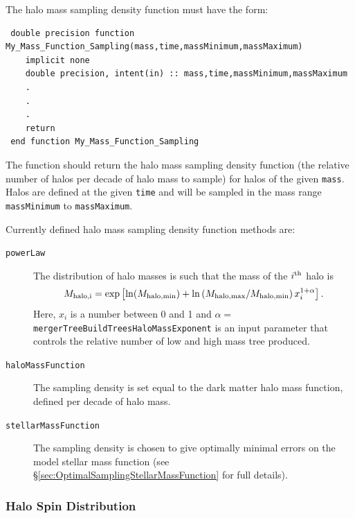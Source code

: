 The halo mass sampling density function must have the form:
\begin{verbatim}
 double precision function My_Mass_Function_Sampling(mass,time,massMinimum,massMaximum)
    implicit none
    double precision, intent(in) :: mass,time,massMinimum,massMaximum
    .
    .
    .
    return
 end function My_Mass_Function_Sampling
\end{verbatim}
The function should return the halo mass sampling density function (the relative number of halos per decade of halo mass to sample) for halos of the given {\tt mass}. Halos are defined at the given {\tt time} and will be sampled in the mass range {\tt massMinimum} to {\tt massMaximum}.

Currently defined halo mass sampling density function methods are:
\begin{description}
 \item [{\tt powerLaw}] The distribution of halo masses is such that the mass of the $i^{\rm th}$ halo is
\begin{equation}
 M_{\rm halo,i} = \exp\left[ \ln(M_{\rm halo,min}) + \ln\left({M_{\rm halo,max}/M_{\rm halo,min}}\right) x_i^{1+\alpha} \right].
\end{equation}
Here, $x_i$ is a number between 0 and 1 and $\alpha=${\tt mergerTreeBuildTreesHaloMassExponent} is an input parameter that controls the relative number of low and high mass tree produced. 
\item [{\tt haloMassFunction}] The sampling density is set equal to the dark matter halo mass function, defined per decade of halo mass.
\item [{\tt stellarMassFunction}] The sampling density is chosen to give optimally minimal errors on the model stellar mass function (see \S\ref{sec:OptimalSamplingStellarMassFunction} for full details).
\end{description}

\subsubsection{Halo Spin Distribution}


